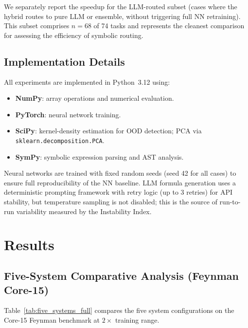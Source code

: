 \documentclass[twoside,11pt]{article}
\begin{document}
We separately report the speedup for the LLM-routed subset (cases where the
hybrid routes to pure LLM or ensemble, without triggering full NN retraining).
This subset comprises $n=68$ of 74 tasks and represents the cleanest comparison
for assessing the efficiency of symbolic routing.

\subsection{Implementation Details}
\label{sec:setup_impl}

All experiments are implemented in Python~3.12 using:
\begin{itemize}
  \item \textbf{NumPy}: array operations and numerical evaluation.
  \item \textbf{PyTorch}: neural network training.
  \item \textbf{SciPy}: kernel-density estimation for OOD detection; PCA via
    \texttt{sklearn.decomposition.PCA}.
  \item \textbf{SymPy}: symbolic expression parsing and AST analysis.
\end{itemize}

Neural networks are trained with fixed random seeds (seed 42 for all cases) to
ensure full reproducibility of the NN baseline.  LLM formula generation uses a
deterministic prompting framework with retry logic (up to 3 retries) for API
stability, but temperature sampling is not disabled; this is the source of
run-to-run variability measured by the Instability Index.

\section{Results}
\label{sec:results}

\subsection{Five-System Comparative Analysis (Feynman Core-15)}
\label{sec:five_systems}

Table~\ref{tab:five_systems_full} compares the five system configurations on the
Core-15 Feynman benchmark at $2\times$ training range.
\end{document}
